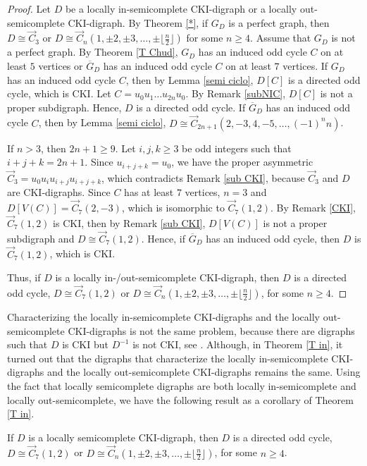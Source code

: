 \begin{proof}
Let $D$ be a  locally in-semicomplete CKI-digraph or a  locally out-semicomplete CKI-digraph. By Theorem \ref{*}, if $G_D$ is a perfect graph, then $D\cong \overrightarrow{C}_3$ or $D\cong \overrightarrow{C}_n(1,\pm2,\pm3,\dots,\pm\lfloor \frac{n}{2}\rfloor)$ for some $n\ge4$.
Assume that $G_D$ is not a perfect graph. By Theorem \ref{T Chud}, $G_D$ has an induced odd cycle $C$ on at least $5$ vertices or $\overline{G}_D$ has an induced odd cycle $C$ on at least $7$ vertices.
%
If $G_D$ has an induced odd cycle $C$, then by Lemma \ref{semi ciclo}, $D[C]$ is a directed odd cycle, which is CKI. Let ${C=u_0u_1\dots u_{2n}}u_0$. By {Remark \ref{subNIC}}, $D[C]$ is not a proper subdigraph. Hence, $D$ is a directed odd cycle.
If $\overline{G}_D$ has an induced odd cycle $C$, then by  Lemma \ref{semi ciclo}, $D\cong \overrightarrow{C}_{2n+1}(2,-3,4,-5,\dots, (-1)^nn)$.

If $n>3$, then $2n+1\ge 9$. Let $i,j,k\ge3$ be odd integers such that $i+j+k=2n+1$. Since $u_{i+j+k}=u_0$, we have the  proper  asymmetric $\overrightarrow{C}_3=u_0u_iu_{i+j}u_{i+j+k}$, which  contradicts Remark \ref{sub CKI}, because $\overrightarrow{C}_3$ and $D$ are CKI-digraphs.
Since $C$ has at least $7$ vertices,  $n=3$ and  $D[V(C)]=\overrightarrow{C}_{7}(2,-3)$, which is isomorphic to $\overrightarrow{C}_{7}(1,2)$. 
By Remark \ref{CKI}, $\overrightarrow{C}_{7}(1,2)$ is CKI, then by Remark \ref{sub CKI}, $D[V(C)]$ is not a proper subdigraph and $D\cong \overrightarrow{C}_{7}(1,2)$. Hence, if  $\overline{G}_D$ has an induced odd cycle, then $D$ is $\overrightarrow{C}_7(1,2)$, which is CKI.

Thus, if $D$ is a  locally in-/out-semicomplete CKI-digraph, then $D$ is a directed odd cycle, $D\cong \overrightarrow{C}_7(1,2)$ or $D\cong \overrightarrow{C}_n(1,\pm2,\pm3,\dots,\pm\lfloor \frac{n}{2}\rfloor)$, for some $n\ge4$.
\end{proof}

Characterizing the locally in-semicomplete CKI-digraphs and the locally out-semicomplete CKI-digraphs is not the same problem, because there are digraphs such that $D$ is CKI but $D^{-1}$ is not CKI, see \cite{duchet1981note}.  Although, in Theorem \ref{T in}, it turned out that the digraphs that characterize the locally in-semicomplete CKI-digraphs and the locally out-semicomplete CKI-digraphs remains the same. 
Using the fact that  locally semicomplete digraphs are both locally in-semicomplete and locally out-semicomplete, we have the following result as a corollary of Theorem \ref{T in}.
\begin{coro}\label{T}
If $D$ is a locally semicomplete CKI-digraph, then $D$ is a directed odd cycle, $D\cong \overrightarrow{C}_7(1,2)$ or $D\cong \overrightarrow{C}_n(1,\pm2,\pm3,\dots,\pm\lfloor \frac{n}{2}\rfloor)$, for some $n\ge4$.
\end{coro}

